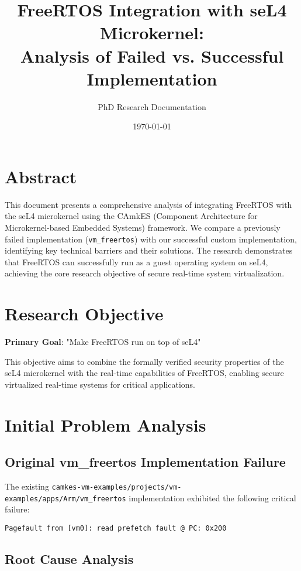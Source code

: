 \documentclass[12pt]{article}
\title{FreeRTOS Integration with seL4 Microkernel: \\
       Analysis of Failed vs. Successful Implementation}
\author{PhD Research Documentation}
\date{\today}
\begin{document}
\maketitle

\tableofcontents
\newpage

\section{Abstract}

This document presents a comprehensive analysis of integrating FreeRTOS with the seL4 microkernel using the CAmkES (Component Architecture for Microkernel-based Embedded Systems) framework. We compare a previously failed implementation (\texttt{vm\_freertos}) with our successful custom implementation, identifying key technical barriers and their solutions. The research demonstrates that FreeRTOS can successfully run as a guest operating system on seL4, achieving the core research objective of secure real-time system virtualization.

\section{Research Objective}

\textbf{Primary Goal}: "Make FreeRTOS run on top of seL4"

This objective aims to combine the formally verified security properties of the seL4 microkernel with the real-time capabilities of FreeRTOS, enabling secure virtualized real-time systems for critical applications.

\section{Initial Problem Analysis}

\subsection{Original vm\_freertos Implementation Failure}

The existing \texttt{camkes-vm-examples/projects/vm-examples/apps/Arm/vm\_freertos} implementation exhibited the following critical failure:

\begin{lstlisting}[caption=Original Failure Output]
Pagefault from [vm0]: read prefetch fault @ PC: 0x200
\end{lstlisting}

\subsection{Root Cause Analysis}
\end{document}
